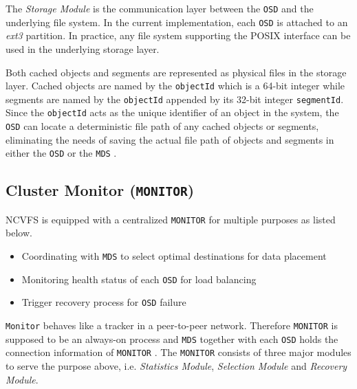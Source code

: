 \documentclass{article}
\def\osd{\texttt{OSD} }
\def\mds{\texttt{MDS} }
\def\monitor{\texttt{MONITOR} }
\begin{document}
The \textit{Storage Module} is the communication layer between the \osd and the underlying file 
system. In the current implementation, each \osd is attached to an \textit{ext3} partition.
In practice, any file system supporting the POSIX interface can be used in the underlying storage
layer. 

Both cached objects and segments are represented as physical files in the storage layer. 
Cached objects are named by the \texttt{objectId} which is a 64-bit integer while segments
are named by the \texttt{objectId} appended by its 32-bit integer \texttt{segmentId}. 
Since the \texttt{objectId} acts as the unique identifier of an object in the
system, the \osd can locate a deterministic file path of any cached objects or
segments, eliminating the needs of saving the actual file path of objects and
segments in either the \osd or the \mds .

\subsection{Cluster Monitor (\texttt{MONITOR})}
NCVFS is equipped with a centralized \monitor for multiple 
purposes as listed below.
\begin{itemize}
	\item Coordinating with \mds to select optimal destinations for data placement
	\item Monitoring health status of each \osd for load balancing
	\item Trigger recovery process for \osd failure
\end{itemize}

\texttt{Monitor} behaves like a tracker in a peer-to-peer network. Therefore 
\monitor is supposed to be an always-on process and \mds together with each \osd
holds the connection information of \monitor. The \monitor consists of three 
major modules to serve the purpose above, i.e. \textit{Statistics Module},
\textit{Selection Module} and \textit{Recovery Module}.
\end{document}
